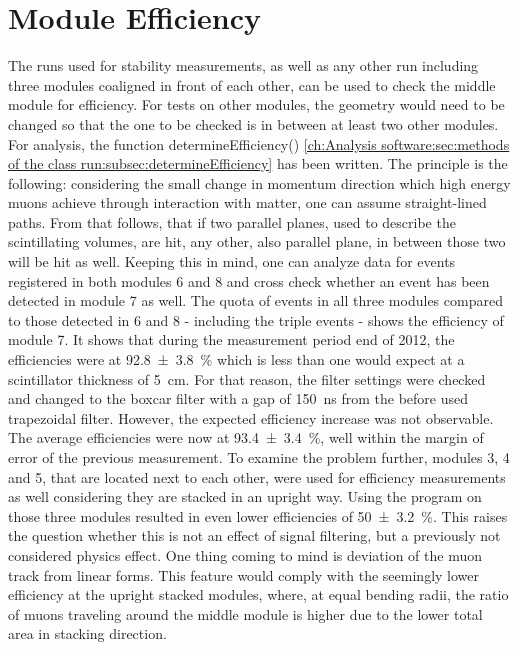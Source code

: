  \section{Module Efficiency}
  \label{ch:Analysis:sec:Module Efficiency}
  The runs used for stability measurements, as well as any other run including three modules coaligned in front of each other, can be used to check the middle module for efficiency. For tests on other modules, the geometry would need to be changed so that the one to be checked is in between at least two other modules.
  For analysis, the function determineEfficiency() \ref{ch:Analysis software:sec:methods of the class run:subsec:determineEfficiency}
  has been written.
  The principle is the following: considering the small change in momentum direction which high energy muons achieve through interaction with matter, one can assume straight-lined paths. From that follows, that if two parallel planes, used to describe the scintillating volumes, are hit, any other, also parallel plane, in between those two will be hit as well. Keeping this in mind, one can analyze data for events registered in both modules 6 and 8 and cross check whether an event has been detected in module 7 as well. The quota of events in all three modules compared to those detected in 6 and 8 -  including the triple events - shows the efficiency of module 7.
  It shows that during the measurement period end of 2012, the efficiencies were at \SI{92.8\pm 3.8 }{\percent} which is less than one would expect at a scintillator thickness of \SI{5}{\centi\meter}.
  For that reason, the filter settings were checked and changed to the boxcar filter with a gap of \SI{150}{\ns} from the before used trapezoidal filter. However, the expected efficiency increase was not observable. The average efficiencies were now at \SI{93.4 \pm 3.4}{\percent}, well within the margin of error of the previous measurement.
  To examine the problem further, modules 3, 4 and 5, that are located next to each other, were used for efficiency measurements as well considering they are stacked in an upright way. Using the program on those three modules resulted in even lower efficiencies of \SI{50\pm 3.2}{\percent}. This raises the question whether this is not an effect of signal filtering, but a previously not considered physics effect. One thing coming to mind is deviation of the muon track from linear forms. This feature would comply with the seemingly lower efficiency at the upright stacked modules, where, at equal bending radii, the ratio of muons traveling around the middle module is higher due to the lower total area in stacking direction.
